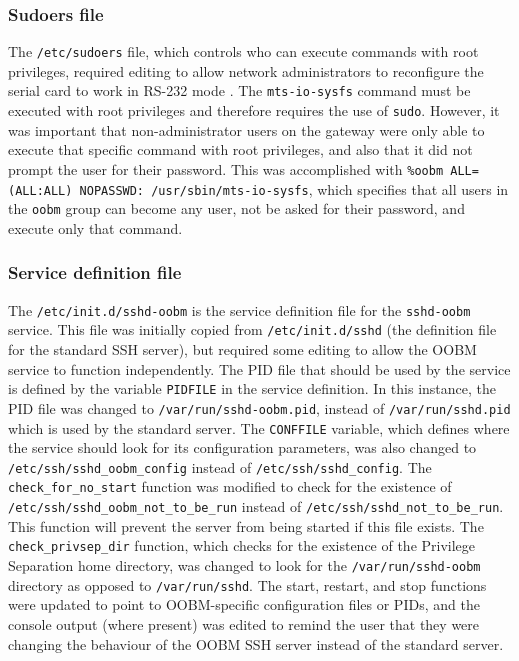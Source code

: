 \subsubsection{Sudoers file}
\label{subsubsection:dev-sshdaemon-configuration-sudoers}
The \verb|/etc/sudoers| file, which controls who can execute commands with root privileges, required editing to allow network administrators to reconfigure the serial card to work in RS-232 mode \citep{multitech-dev-rs232}. The \verb|mts-io-sysfs| command must be executed with root privileges and therefore requires the use of \verb|sudo|. However, it was important that non-administrator users on the gateway were only able to execute that specific command with root privileges, and also that it did not prompt the user for their password. This was accomplished with \verb|%oobm ALL=(ALL:ALL) NOPASSWD: /usr/sbin/mts-io-sysfs|, which specifies that all users in the \verb|oobm| group can become any user, not be asked for their password, and execute only that command.
\subsubsection{Service definition file}
\label{subsubsection:dev-sshdaemon-configuration-initd}
The \verb|/etc/init.d/sshd-oobm| is the service definition file for the \verb|sshd-oobm| service. This file was initially copied from \verb|/etc/init.d/sshd| (the definition file for the standard SSH server), but required some editing to allow the OOBM service to function independently. The PID file that should be used by the service is defined by the variable \verb|PIDFILE| in the service definition. In this instance, the PID file was changed to \verb|/var/run/sshd-oobm.pid|, instead of \verb|/var/run/sshd.pid| which is used by the standard server. The \verb|CONFFILE| variable, which defines where the service should look for its configuration parameters, was also changed to \verb|/etc/ssh/sshd_oobm_config| instead of \verb|/etc/ssh/sshd_config|. The \verb|check_for_no_start| function was modified to check for the existence of \verb|/etc/ssh/sshd_oobm_not_to_be_run| instead of \verb|/etc/ssh/sshd_not_to_be_run|. This function will prevent the server from being started if this file exists. The \verb|check_privsep_dir| function, which checks for the existence of the Privilege Separation home directory, was changed to look for the \verb|/var/run/sshd-oobm| directory as opposed to \verb|/var/run/sshd|. The start, restart, and stop functions were updated to point to OOBM-specific configuration files or PIDs, and the console output (where present) was edited to remind the user that they were changing the behaviour of the OOBM SSH server instead of the standard server. 
